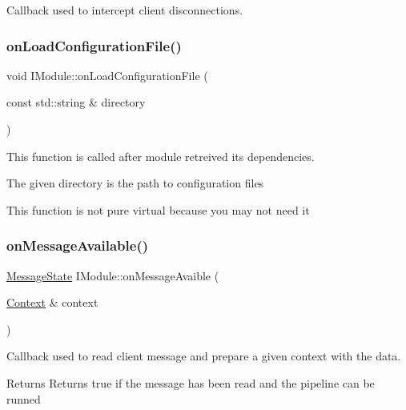 Callback used to intercept client disconnections. 

\mbox{\label{classo_z_1_1_i_module_a61a2cc76594401ed2f50931a6a6b76f3}} 
\subsubsection{\texorpdfstring{onLoadConfigurationFile()}{onLoadConfigurationFile()}}
{\footnotesize\ttfamily void I\+Module\+::on\+Load\+Configuration\+File (\begin{DoxyParamCaption}\item[{const std\+::string \&}]{directory }\end{DoxyParamCaption})\hspace{0.3cm}{\ttfamily [virtual]}}



This function is called after module retreived its dependencies. 

The given directory is the path to configuration files

This function is not pure virtual because you may not need it \mbox{\label{classo_z_1_1_i_module_a241ee86ca88d4733ccea5a530fd1bbc9}} 
\subsubsection{\texorpdfstring{onMessageAvailable()}{onMessageAvailable()}}
{\footnotesize\ttfamily \mbox{\hyperlink{namespaceo_z_aca1addfd2374772c2b5db4bc5a96422c}{Message\+State}} I\+Module\+::on\+Message\+Avaible (\begin{DoxyParamCaption}\item[{\mbox{\hyperlink{classo_z_1_1_context}{Context}} \&}]{context }\end{DoxyParamCaption})\hspace{0.3cm}{\ttfamily [virtual]}}



Callback used to read client message and prepare a given context with the data. 

\begin{DoxyReturn}{Returns}
Returns true if the message has been read and the pipeline can be runned 
\end{DoxyReturn}
\mbox{\label{classo_z_1_1_i_module_a3dc905faa6df5e22eecc6ffbc923fd95}} 
